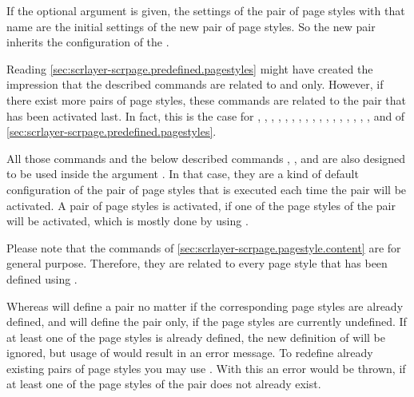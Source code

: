 If the optional argument  is given, the settings of the
pair of page styles with that name are the initial settings of the new pair of
page styles. So the new pair inherits the configuration of the .

Reading \autoref{sec:scrlayer-scrpage.predefined.pagestyles} might have
created the impression that the described commands are related to
 and  only. However, if
there exist more pairs of page styles, these commands are related to the pair
that has been activated last. In fact, this is the case for ,
, , , ,
, , , ,
, , , , ,
, , , and  of
\autoref{sec:scrlayer-scrpage.predefined.pagestyles}.

All those commands and the below described commands
, , and
 are also designed to be used inside the argument
. In that case, they are a kind of default configuration of
the pair of page styles that is executed each time the pair will be
activated. A pair of page styles is activated, if one of the page styles of
the pair will be activated, which is mostly done by using
.

Please note that the commands of
\autoref{sec:scrlayer-scrpage.pagestyle.content} are for general
purpose. Therefore, they are related to every page style that has been defined
using .

Whereas  will define a pair no matter if the
corresponding page styles are already defined,  and
 will define the pair only, if the page styles
are currently undefined. If at least one of the page styles is already
defined, the new definition of  will be
ignored, but usage of  would result in an error
message. To redefine already existing pairs of page styles you may use
. With this an error would be thrown, if at least
one of the page styles of the pair does not already exist.%
\EndIndexGroup


